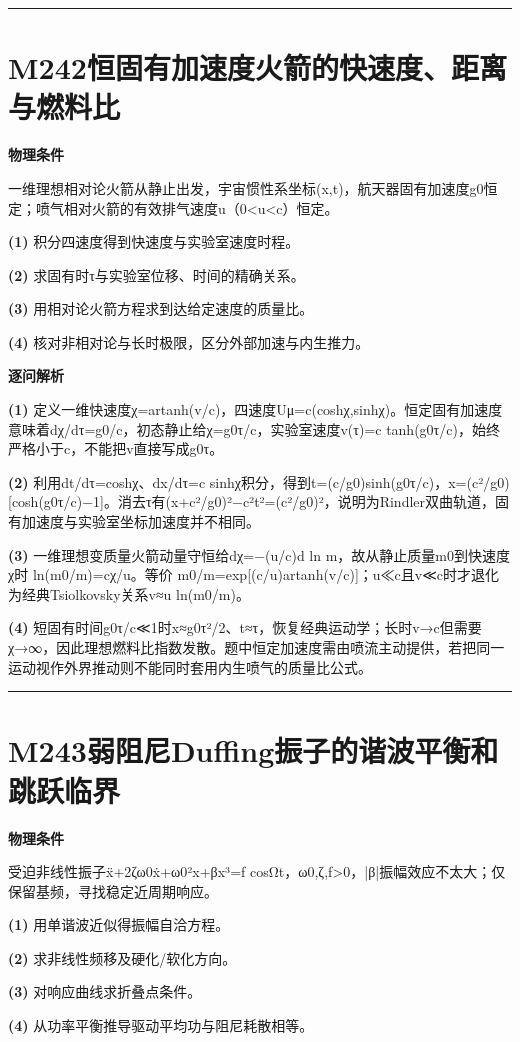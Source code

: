 \documentclass[UTF8,a4paper,11pt,oneside,openany]{ctexbook}
\begin{document}
\par\bigskip\hrule\bigskip
\section*{M242\quad 恒固有加速度火箭的快速度、距离与燃料比}
\textbf{物理条件}\par 一维理想相对论火箭从静止出发，宇宙惯性系坐标(x,t)，航天器固有加速度g0恒定；喷气相对火箭的有效排气速度u（0<u<c）恒定。
\par\noindent\textbf{(1)} 积分四速度得到快速度与实验室速度时程。
\par\noindent\textbf{(2)} 求固有时τ与实验室位移、时间的精确关系。
\par\noindent\textbf{(3)} 用相对论火箭方程求到达给定速度的质量比。
\par\noindent\textbf{(4)} 核对非相对论与长时极限，区分外部加速与内生推力。

\par\medskip\noindent\textbf{逐问解析}
\par\noindent\textbf{(1)} 定义一维快速度χ=artanh(v/c)，四速度Uμ=c(coshχ,sinhχ)。恒定固有加速度意味着dχ/dτ=g0/c，初态静止给χ=g0τ/c，实验室速度v(τ)=c tanh(g0τ/c)，始终严格小于c，不能把v直接写成g0τ。
\par\noindent\textbf{(2)} 利用dt/dτ=coshχ、dx/dτ=c sinhχ积分，得到t=(c/g0)sinh(g0τ/c)，x=(c²/g0)[cosh(g0τ/c)−1]。消去τ有(x+c²/g0)²−c²t²=(c²/g0)²，说明为Rindler双曲轨道，固有加速度与实验室坐标加速度并不相同。
\par\noindent\textbf{(3)} 一维理想变质量火箭动量守恒给dχ=−(u/c)d ln m，故从静止质量m0到快速度χ时 ln(m0/m)=cχ/u。等价 m0/m=exp[(c/u)artanh(v/c)]；u≪c且v≪c时才退化为经典Tsiolkovsky关系v≈u ln(m0/m)。
\par\noindent\textbf{(4)} 短固有时间g0τ/c≪1时x≈g0τ²/2、t≈τ，恢复经典运动学；长时v→c但需要χ→∞，因此理想燃料比指数发散。题中恒定加速度需由喷流主动提供，若把同一运动视作外界推动则不能同时套用内生喷气的质量比公式。

\par\bigskip\hrule\bigskip
\section*{M243\quad 弱阻尼Duffing振子的谐波平衡和跳跃临界}
\textbf{物理条件}\par 受迫非线性振子ẍ+2ζω0ẋ+ω0²x+βx³=f cosΩt，ω0,ζ,f>0，|β|振幅效应不太大；仅保留基频，寻找稳定近周期响应。
\par\noindent\textbf{(1)} 用单谐波近似得振幅自洽方程。
\par\noindent\textbf{(2)} 求非线性频移及硬化/软化方向。
\par\noindent\textbf{(3)} 对响应曲线求折叠点条件。
\par\noindent\textbf{(4)} 从功率平衡推导驱动平均功与阻尼耗散相等。
\end{document}
